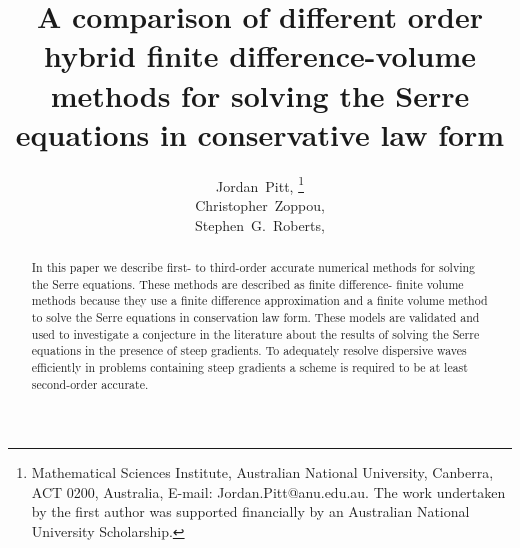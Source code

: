 \documentclass[SingleSpace,12pt,Proceedings]{Serre_ASCE}
\begin{document}
\title{A comparison of different order hybrid finite difference-volume methods for solving the Serre equations in conservative law form}

\author{
Jordan~Pitt,%
\thanks{Mathematical Sciences Institute, Australian National University, Canberra, ACT 0200, Australia, E-mail: Jordan.Pitt@anu.edu.au. The work undertaken by the first author was supported financially by an Australian National University Scholarship.}
\\
Christopher~Zoppou,\footnotemark[1]%
%
\\
Stephen~G.~Roberts,\footnotemark[1]
}

\maketitle

\begin{abstract}
In this paper we describe first- to third-order accurate numerical methods for solving the Serre equations. These methods are described as finite difference- finite volume methods because they use a finite difference approximation and a finite volume method to solve the Serre equations in conservation law form. These models are validated and used to investigate a conjecture in the literature about the results of solving the Serre equations in the presence of steep gradients. To adequately resolve dispersive waves efficiently in problems containing steep gradients a scheme is required to be at least second-order accurate.

\end{abstract}


\linenumbers

\end{document}
